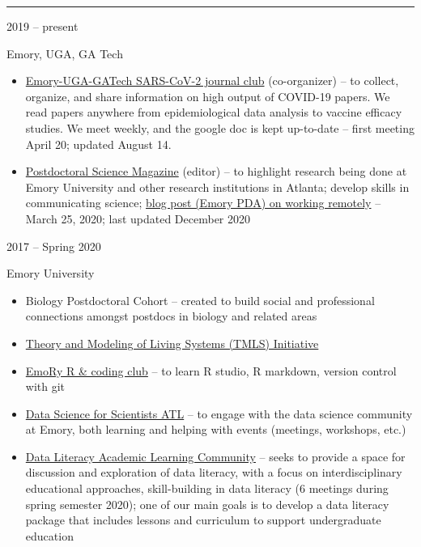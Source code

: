 \documentclass[a4paper,10pt]{article}
\newlength{\cvcolumngapwidth}
\newlength{\cvleftcolumnwidth}
\newlength{\cvrightcolumnwidth}
\newcommand{\cvsectionstyle}[1]{{\normalsize\cvsectionfont\textcolor{cvsectioncolor}{#1}}}
\newcommand{\cvtitlestyle}[1]{{\large\cvtitlefont\textcolor{cvtitlecolor}{#1}}}
\newcommand{\cvheadingstyle}[1]{{\normalsize\cvheadingfont\textcolor{cvheadingcolor}{#1}}}
\newlength{\cvafteritemskipamount}
\newlength{\cvaftersectionskipamount}
\newlength{\cvbetweensectionandheadingextraskipamount}
\newlength{\cvaftertitleskipamount}
\newlength{\cvparskip}
\newcommand{\cvsection}[1]{
    \begin{minipage}[t]{\cvleftcolumnwidth}
        \raggedleft\cvsectionstyle{#1}
    \end{minipage}%
    \hspace{\cvcolumngapwidth}%
    \begin{minipage}[t]{\cvrightcolumnwidth}
        \textcolor{cvrulecolor}{\rule{\cvrightcolumnwidth}{0.3mm}}
    \end{minipage}

    \vspace{\cvaftersectionskipamount}
}
\newcommand{\cvitem}[2]{
    \begin{minipage}[t]{\cvleftcolumnwidth}
        \raggedleft #1
    \end{minipage}%
    \hspace{\cvcolumngapwidth}%
    \begin{minipage}[t]{\cvrightcolumnwidth}
        \setlength{\parskip}{\cvparskip} #2
    \end{minipage}

    \vspace{\cvafteritemskipamount}
}
\newcommand{\cvtitle}[1]{
    \cvtitlestyle{#1}

    \vspace{\cvaftertitleskipamount}
    \vspace{-\cvparskip}
}
\begin{document}
\cvsection{GROUPS \& ORGANIZATIONS}
\vspace{\cvbetweensectionandheadingextraskipamount}

\cvitem{
    \cvheadingstyle{2019 -- present}
}{
    \cvtitle{Emory, UGA, GA Tech}
    \begin{itemize}[leftmargin=*]
        	\item \href{https://docs.google.com/document/d/1jMU-Rc--9MpwKwmoHNcR_SD4T0128dSvHaiJtECwO50/edit?usp=sharing}{Emory-UGA-GATech SARS-CoV-2 journal club} (co-organizer) --  to collect, organize, and share information on high output of COVID-19 papers. We read papers anywhere from epidemiological data analysis to vaccine efficacy studies. We meet weekly, and the google doc is kept up-to-date -- first meeting April 20; updated August 14.  \\
    	\item \href{https://emorypda.wordpress.com/postdoc-newsletter/}{Postdoctoral Science Magazine} (editor) --  to highlight research being done at Emory University and other research institutions in Atlanta; develop skills in communicating science; \href{https://emorypda.wordpress.com/2020/03/25/working-remotely-here-are-some-tips-to-stay-safe-and-productive-during-a-pandemic/}{blog post (Emory PDA) on working remotely} -- March 25, 2020; last updated December 2020 \\
    \end{itemize}
}

\cvitem{
    \cvheadingstyle{2017 -- Spring 2020}
}{
    \cvtitle{Emory University}
    \begin{itemize}[leftmargin=*]
        \item Biology Postdoctoral Cohort -- created to build social and professional connections amongst postdocs in biology and related areas \\
        \item \href{http://livingtheory.emory.edu/}{Theory and Modeling of Living Systems (TMLS) Initiative} \\
        \item \href{https://darwinanddavis.github.io/EmoRyCodingClub/index.html}{EmoRy R \& coding club} -- to learn R studio, R markdown, version control with git \\
        \item \href{https://emory.campuslabs.com/engage/organization/data-science-for-scientists-atl}{Data Science for Scientists ATL} -- to engage with the data science community at Emory, both learning and helping with events (meetings, workshops, etc.) \\
        \item \href{http://cfde.emory.edu/news-events/news/2019/november/data-literacy-alc.html}{Data Literacy Academic Learning Community} -- seeks to provide a space for discussion and exploration of data literacy, with a focus on interdisciplinary educational approaches, skill-building in data literacy (6 meetings during spring semester 2020); one of our main goals is to develop a data literacy package that includes lessons and curriculum to support undergraduate education
    \end{itemize}
}
\end{document}
